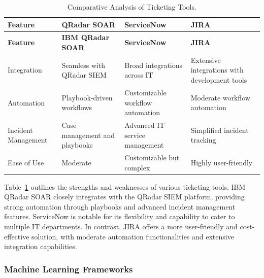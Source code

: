 \begin{longtable}{@{}p{3cm}p{3cm}p{3cm}p{3cm}@{}}
    \caption{Comparative Analysis of Ticketing Tools.}
    \label{tab:tt_ca} \\
    \toprule
    \textbf{Feature} & \textbf{QRadar SOAR} & \textbf{ServiceNow} & \textbf{JIRA} \\
    \midrule
    \endfirsthead
    \toprule
    \textbf{Feature} & \textbf{IBM QRadar SOAR} & \textbf{ServiceNow} & \textbf{JIRA} \\
    \midrule
    \endhead
    \bottomrule
    \endfoot
    \bottomrule
    \endlastfoot
    Integration & Seamless with QRadar SIEM & Broad integrations across IT & Extensive integrations with development tools \\
    Automation & Playbook-driven workflows & Customizable workflow automation & Moderate workflow automation \\
    Incident Management & Case management and playbooks & Advanced IT service management & Simplified incident tracking \\
    Ease of Use & Moderate & Customizable but complex & Highly user-friendly \\
\end{longtable}
    
Table~\ref{tab:tt_ca} outlines the strengths and weaknesses of various ticketing tools. 
IBM QRadar SOAR closely integrates with the QRadar SIEM platform, providing strong automation through playbooks and advanced incident management features. 
ServiceNow is notable for its flexibility and capability to cater to multiple IT departments. 
In contrast, JIRA offers a more user-friendly and cost-effective solution, with moderate automation functionalities and extensive integration capabilities.

\subsubsection{Machine Learning Frameworks}

